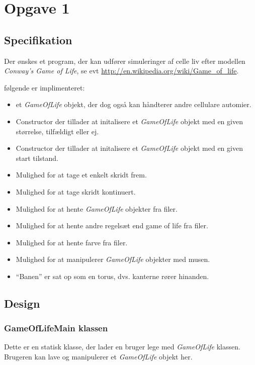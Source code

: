 \newcommand{\gol}{\emph{GameOfLife}}

\section{Opgave 1}

\subsection{Specifikation}
Der ønskes et program, der kan udfører simuleringer af celle liv efter modellen \emph{Conway's Game of Life},
se evt \url{http://en.wikipedia.org/wiki/Game_of_life}.

følgende er implimenteret:
\begin{itemize}
  \item et \emph{GameOfLife} objekt, der dog også kan håndterer andre cellulare automier.
  \item Constructor der tillader at initalisere et \emph{GameOfLife} objekt
  med en given størrelse, tilfældigt eller ej.
  \item Constructor der tillader at initalisere et \emph{GameOfLife} objekt
  med en given start tilstand.
  \item Mulighed for at tage et enkelt skridt frem.
  \item Mulighed for at tage skridt kontinuert.
  \item Mulighed for at hente \emph{GameOfLife} objekter fra filer.
  \item Mulighed for at hente andre regelsæt end game of life fra filer.
  \item Mulighed for at hente farve fra filer.
  \item Mulighed for at manipulerer \emph{GameOfLife} objekter med musen.
  \item ``Banen'' er sat op som en torus, dvs. kanterne rører hinanden.
\end{itemize}

\subsection{Design}

\subsubsection{ GameOfLifeMain klassen }
Dette er en statisk klasse, der lader en bruger lege med \emph{GameOfLife} klassen.
Brugeren kan lave og manipulerer et \emph{GameOfLife} objekt her.

